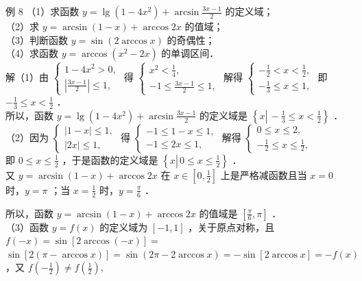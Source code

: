 \documentclass[10pt]{article}
\begin{document}
例 8 （1）求函数 \(y=\lg \left(1-4 x^{2}\right)+\arcsin \frac{3 x-1}{2}\) 的定义域；\\
（2）求 \(y=\arcsin (1-x)+\arccos 2 x\) 的值域；\\
（3）判断函数 \(y=\sin (2 \arccos x)\) 的奇偶性；\\
（4）求函数 \(y=\arccos \left(x^{2}-2 x\right)\) 的单调区间．\\
解（1）由 \(\left\{\begin{array}{l}1-4 x^{2}>0, \\ \left|\frac{3 x-1}{2}\right| \leqslant 1,\end{array}\right.\) 得 \(\left\{\begin{array}{l}x^{2}<\frac{1}{4}, \\ -1 \leqslant \frac{3 x-1}{2} \leqslant 1,\end{array}\right.\) 解得 \(\left\{\begin{array}{l}-\frac{1}{2}<x<\frac{1}{2}, \\ -\frac{1}{3} \leqslant x \leqslant 1,\end{array}\right.\) 即 \(-\frac{1}{3} \leqslant x<\frac{1}{2}\) ．\\
所以，函数 \(y=\lg \left(1-4 x^{2}\right)+\arcsin \frac{3 x-1}{2}\) 的定义域是 \(\left\{x \left\lvert\,-\frac{1}{3} \leqslant x<\frac{1}{2}\right.\right\}\) ．\\
（2）因为 \(\left\{\begin{array}{l}|1-x| \leqslant 1, \\ |2 x| \leqslant 1,\end{array}\right.\) 得 \(\left\{\begin{array}{l}-1 \leqslant 1-x \leqslant 1, \\ -1 \leqslant 2 x \leqslant 1,\end{array}\right.\) 解得 \(\left\{\begin{array}{l}0 \leqslant x \leqslant 2, \\ -\frac{1}{2} \leqslant x \leqslant \frac{1}{2},\end{array}\right.\)\\
即 \(0 \leqslant x \leqslant \frac{1}{2}\) ，于是函数的定义域是 \(\left\{x \left\lvert\, 0 \leqslant x \leqslant \frac{1}{2}\right.\right\}\) ．\\
又 \(y=\arcsin (1-x)+\arccos 2 x\) 在 \(x \in\left[0, \frac{1}{2}\right]\) 上是严格减函数且当 \(x=0\) 时，\(y=\pi\) ；当 \(x=\frac{1}{2}\) 时，\(y=\frac{\pi}{6}\) ．

所以，函数 \(y=\arcsin (1-x)+\arccos 2 x\) 的值域是 \(\left[\frac{\pi}{6}, \pi\right]\) ．\\
（3）函数 \(y=f(x)\) 的定义域为 \([-1,1]\) ，关于原点对称，且 \(f(-x)=\sin [2 \arccos (-x)]=\) \(\sin [2(\pi-\arccos x)]=\sin (2 \pi-2 \arccos x)=-\sin [2 \arccos x]=-f(x)\) ，又 \(f\left(-\frac{1}{2}\right) \neq f\left(\frac{1}{2}\right)\),
\end{document}
